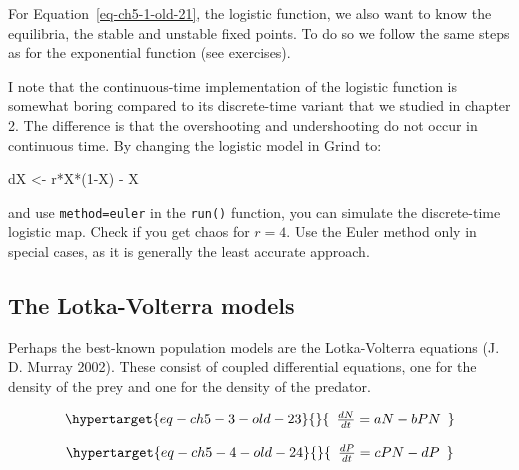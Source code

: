 \documentclass[
  letterpaper,
]{scrbook}
\newenvironment{Shaded}{\begin{snugshade}}{\end{snugshade}}
\newcommand{\DecValTok}[1]{\textcolor[rgb]{0.68,0.00,0.00}{#1}}
\newcommand{\NormalTok}[1]{\textcolor[rgb]{0.00,0.23,0.31}{#1}}
\newcommand{\OtherTok}[1]{\textcolor[rgb]{0.00,0.23,0.31}{#1}}
\newcommand{\SpecialCharTok}[1]{\textcolor[rgb]{0.37,0.37,0.37}{#1}}
\begin{document}
For Equation~\ref{eq-ch5-1-old-21}, the logistic function, we also want
to know the equilibria, the stable and unstable fixed points. To do so
we follow the same steps as for the exponential function (see
exercises).

I note that the continuous-time implementation of the logistic function
is somewhat boring compared to its discrete-time variant that we studied
in chapter 2. The difference is that the overshooting and undershooting
do not occur in continuous time. By changing the logistic model in Grind
to:

\begin{Shaded}
\begin{Highlighting}[]
\NormalTok{dX }\OtherTok{\textless{}{-}}\NormalTok{ r}\SpecialCharTok{*}\NormalTok{X}\SpecialCharTok{*}\NormalTok{(}\DecValTok{1}\SpecialCharTok{{-}}\NormalTok{X) }\SpecialCharTok{{-}}\NormalTok{ X }
\end{Highlighting}
\end{Shaded}

and use \texttt{method=\textquotesingle{}euler\textquotesingle{}} in the
\texttt{run()} function, you can simulate the discrete-time logistic
map. Check if you get chaos for \(r = 4\). Use the Euler method only in
special cases, as it is generally the least accurate approach.

\hypertarget{the-lotka-volterra-models}{%
\subsection{The Lotka-Volterra models}\label{the-lotka-volterra-models}}

Perhaps the best-known population models are the Lotka-Volterra
equations (J. D. Murray 2002). These consist of coupled differential
equations, one for the density of the prey and one for the density of
the predator.

\begin{equation}\protect\hypertarget{eq-ch5-3-old-23}{}{\begin{array}{r}
\frac{dN}{dt} = aN - bPN
\end{array}}\label{eq-ch5-3-old-23}\end{equation}

\begin{equation}\protect\hypertarget{eq-ch5-4-old-24}{}{\begin{array}{r}
\frac{dP}{dt} = cPN - dP
\end{array}}\label{eq-ch5-4-old-24}\end{equation}
\end{document}
